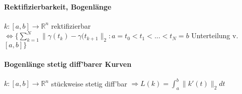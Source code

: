 \documentclass[paper=a3,paper=landscape, fontsize=9pt,DIV=25]{scrartcl}
\newcommand{\real}{{\mathbb{R}}}
\begin{document}
\begin{multicols*}{4}
\paragraph{Rektifizierbarkeit, Bogenlänge}
$k:[a,b]\rightarrow \real^n$ rektifizierbar $\Leftrightarrow \{\sum_{k=1}^{N}\lVert\gamma(t_k)-\gamma(t_{k+1}\rVert_2: a = t_0 < t_1 < ... < t_N = b$ Unterteilung v. $[a,b]\}$
\paragraph{Bogenlänge stetig diff'barer Kurven}
$k: [a,b]\rightarrow \real^n$ stückweise stetig diff'bar $\Rightarrow L(k)=\int_{a}^{b}\lVert k'(t)\rVert_2 dt$

\end{multicols*}
\end{document}
